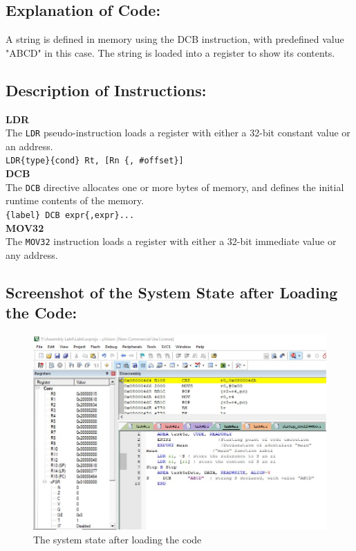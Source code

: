 \documentclass[12pt]{article}
\begin{document}
\subsection{Explanation of Code:} 
A string is defined in memory using the DCB instruction, with predefined value "ABCD" in this case. The string is loaded into a register to show its contents.
\subsection{Description of Instructions:}
\textbf{LDR}\\
The \verb|LDR| pseudo-instruction loads a register with either a 32-bit constant value or an address.\\
\verb|LDR{type}{cond} Rt, [Rn {, #offset}]| \\
\textbf{DCB}\\
The \verb|DCB| directive allocates one or more bytes of memory, and defines the initial runtime contents of the memory.\\
\verb|{label} DCB expr{,expr}...|\\
 \textbf{MOV32} \\ The \verb|MOV32| instruction loads a register with either a 32-bit immediate value or any address.\\
 \pagebreak
\subsection{Screenshot of the System State after Loading the Code:}
\begin{figure}[ht]
     \centering
     \includegraphics[scale=.7]{images/beforetask4a.JPG}
     \caption{The system state after loading the code}
     \label{fig:before_task_four_a}
 \end{figure}
 \pagebreak
\end{document}
